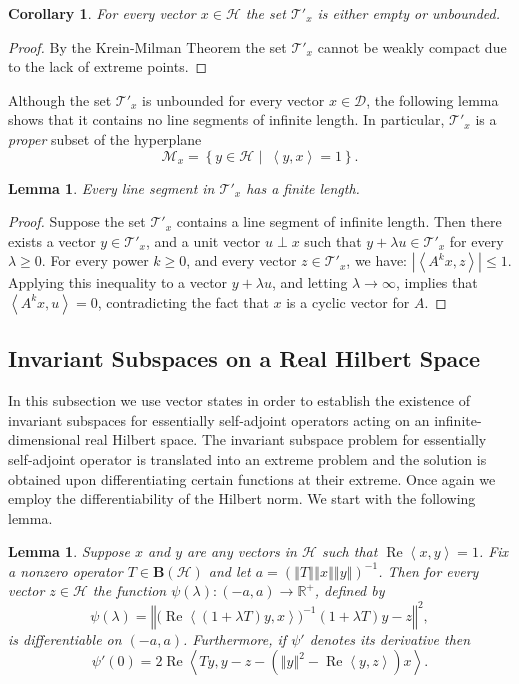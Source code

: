 \documentclass{tran-l}
\newtheorem{cor}[thm]{Corollary}
\newtheorem{lem}[thm]{Lemma}
\theoremstyle{definition}
\theoremstyle{remark}
\numberwithin{equation}{subsection}
\DeclareMathOperator{\RE}{Re}
\newcommand{\To}{\longrightarrow}
\newcommand{\h}{\mathcal{H}}
\newcommand{\M}{\mathcal{M}}
\newcommand{\BH}{\mathbf{B}(\mathcal{H})}
\newcommand{\Real}{\mathbb{R}}
\newcommand{\RPlus}{\Real^{+}}
\newcommand{\EssD}{\mathcal{D}}
\newcommand{\States}{\mathcal{T}}
\newcommand{\abs}[1]{\left\vert#1\right\vert}
\newcommand{\set}[1]{\left\{#1\right\}}
\newcommand{\seq}[1]{\left<#1\right>}
\newcommand{\norm}[1]{\left\Vert#1\right\Vert}
\begin{document}
\begin{cor} \label{c:UNBOUND}
For every vector $x\in\h$ the set $\States'_x$ is either empty or unbounded.
\end{cor}

\begin{proof}
By the Krein-Milman Theorem the set $\States'_x$ cannot be weakly compact due to the lack of extreme points.
\end{proof}

Although the set $\States'_x$ is unbounded for every vector $x\in\EssD$, the following lemma shows that it contains no line segments of infinite length. In particular, $\States'_x$ is a \emph{proper} subset of the hyperplane
\[ \M_x=\set{y\in\h\,\,|\,\,\,\seq{y,x}=1}. \]

\begin{lem} \label{l:FL}
Every line segment in $\States'_x$ has a finite length.
\end{lem}

\begin{proof}
Suppose the set $\States'_x$ contains a line segment of infinite length. Then there exists a vector $y\in\States'_x$, and a unit vector $u\perp{x}$ such that $y+\lambda u\in\States'_x$ for every $\lambda\geq0$. For every power $k\geq0$, and every vector $z\in\States'_x$, we have: $\abs{\seq{A^k x,z}}\leq1$. Applying this inequality to a vector $y+\lambda{u}$, and letting $\lambda\to\infty$, implies that $\seq{A^k x,u}=0$, contradicting the fact that $x$ is a cyclic vector for $A$.
\end{proof}

\subsection{Invariant Subspaces on a Real Hilbert Space}
In this subsection we use vector states in order to establish the existence of invariant subspaces for essentially self-adjoint operators acting on an infinite-dimensional real Hilbert space. The invariant subspace problem for essentially self-adjoint operator is translated into an extreme problem and the solution is obtained upon differentiating certain functions at their extreme. Once again we employ the differentiability of the Hilbert norm. We start with the following lemma.

\begin{lem}\label{l:DIFF}
Suppose $x$ and $y$ are any vectors in $\h$ such that $\RE\seq{x,y}=1$. Fix a nonzero operator $T\in\BH$ and let $a=(\norm{T}\norm{x}\norm{y})^{-1}$. Then for every vector $z\in\h$ the function $\psi(\lambda)\colon(-a,a)\To\RPlus$, defined by
\[ \psi(\lambda) = \norm{
   \big(\RE\seq{(1+\lambda T)y, x}\big)^{-1}
   (1+\lambda T)y - z}^2, \]
is differentiable on $(-a,a)$. Furthermore, if $\psi'$ denotes its derivative then
\[ \psi'(0) = 2\RE\seq{T y, y - z - (\norm{y}^2-\RE\seq{y,z}) x}. \]
\end{lem}
\end{document}
